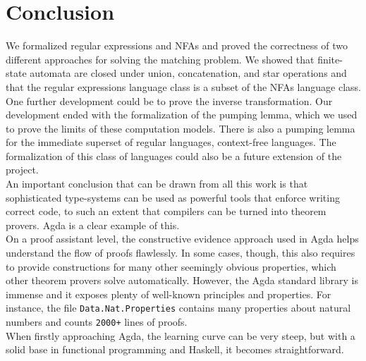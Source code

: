 \chapter{Conclusion}
We formalized regular expressions and NFAs and proved the correctness of two different approaches for solving the matching problem. We showed that finite-state automata are closed under union, concatenation, and star operations and that the regular expressions language class is a subset of the NFAs language class. One further development could be to prove the inverse transformation. Our development ended with the formalization of the pumping lemma, which we used to prove the limits of these computation models. There is also a pumping lemma for the immediate superset of regular languages, context-free languages. The formalization of this class of languages could also be a future extension of the project.\\

An important conclusion that can be drawn from all this work is that sophisticated type-systems can be used as powerful tools that enforce writing correct code, to such an extent that compilers can be turned into theorem provers. Agda is a clear example of this.\\
On a proof assistant level, the constructive evidence approach used in Agda helps understand the flow of proofs flawlessly. In some cases, though, this also requires to provide constructions for many other seemingly obvious properties, which other theorem provers solve automatically. However, the Agda standard library is immense and it exposes plenty of well-known principles and properties. For instance, the file \texttt{Data.Nat.Properties} contains many properties about natural numbers and counts \texttt{2000+} lines of proofs.\\
When firstly approaching Agda, the learning curve can be very steep, but with a solid base in functional programming and Haskell, it becomes straightforward.